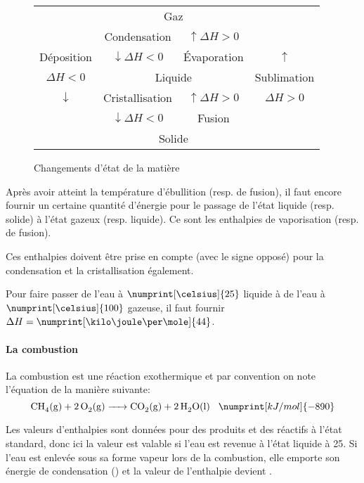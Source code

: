 \begin{figure}[h!]
	\begin{center}
		\begin{tabular}{|c|cc|c|}
			\cline{1-1} \cline{4-4}
			& \multicolumn{2}{c|}{Gaz} & \\
			\cline{2-3}
			\multicolumn{1}{|c}{} & Condensation & \multicolumn{1}{c}{$\uparrow \Delta H > 0$} & \\
			\multicolumn{1}{|c}{Déposition} & $\downarrow \Delta H < 0$ & \multicolumn{1}{c}{\'Evaporation} & $\uparrow$\\
			\cline{2-3}
			$\Delta H < 0$ & \multicolumn{2}{c|}{Liquide} & Sublimation\\
			\cline{2-3}
			\multicolumn{1}{|c}{$\downarrow$} & Cristallisation & \multicolumn{1}{c}{$\uparrow \Delta H > 0$} & $\Delta H > 0$\\
			\multicolumn{1}{|c}{} & $\downarrow \Delta H < 0$ & \multicolumn{1}{c}{Fusion} & \\
			\cline{2-3}
			& \multicolumn{2}{c|}{Solide} &\\
			\cline{1-1} \cline{4-4}
		\end{tabular}
	\end{center}
	\label{fig:state}
	\caption{Changements d'état de la matière}
\end{figure}

Après avoir atteint la température d'ébullition (resp. de fusion), il faut encore fournir un certaine quantité d'énergie pour le passage de l'état liquide (resp. solide) à l'état gazeux (resp. liquide).
Ce sont les enthalpies de vaporisation (resp. de fusion).

Ces enthalpies doivent être prise en compte (avec le signe opposé) pour la condensation et la cristallisation également.

Pour faire passer de l'eau à $\numprint[\celsius]{25}$ liquide à de l'eau à $\numprint[\celsius]{100}$ gazeuse, il faut fournir $\Delta H = \numprint[\kilo\joule\per\mole]{44}$.

\paragraph{La combustion}
La combustion est une réaction exothermique et par convention on note l'équation de la manière suivante:
$$\ce{CH4(g) + 2O2(g) -> CO2(g) + 2H2O(l)}\hspace{3mm}\numprint[kJ/mol]{-890}$$

Les valeurs d'enthalpies sont données pour des produits et des réactifs à l'état standard, donc ici la valeur   est valable si l'eau est revenue à l'état liquide à 25\celsius.
Si l'eau est enlevée sous sa forme vapeur lors de la combustion, elle emporte son énergie de condensation () et la valeur de l'enthalpie devient .


